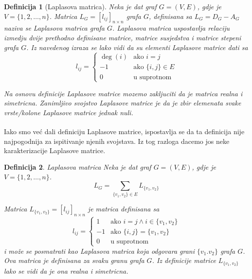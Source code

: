 \documentclass[11pt]{article}
\newtheorem{definition}{Definicija}
\begin{document}
			\begin{definition}[Laplasova matrica] 
			Neka je dat graf $G = (V, E)$, gdje je $V = \{1, 2, \dots, n\}$. Matrica $L_G = [l_{ij}]_{n \times n}$ grafa $G$, definisana sa $L_G = D_G - A_G$ naziva se Laplasova matrica grafa $G$.
			Laplasova matrica uspostavlja relaciju izmedju dvije prethodno definisane matrice, matrice susjedstva i matrice stepeni grafa $G$.
			Iz navedenog izraza se lako vidi da su elementi Laplasove matrice dati sa
			 \[
				 l_{ij} =
				 \begin{cases}
				 \deg(i)  & \text{ako } i = j \\
				 -1 & \text{ako } \{i, j\} \in E \\ 
				 0  & \text{u suprotnom}
				 \end{cases}
			 \]
			
			Na osnovu definicije Laplasove matrice mozemo zakljuciti da je matrica realna i simetricna.
			Zanimljivo svojstvo Laplasove matrice je da je zbir elemenata svake vrste/kolone Laplasove matrice jednak nuli.
			\end{definition}
	
			\paragraph{}
			Iako smo već dali definiciju Laplasove matrice, ispostavlja se da ta definicija nije najpogodnija za ispitivanje njenih svojstava. Iz tog razloga dacemo jos neke karakterizacije Laplasove matrice.
	
			\begin{definition}{Laplasova matrica}
			Neka je dat graf $G = (V, E)$, gdje je $V = \{1, 2, \dots, n\}$. 
			\[
				L_G = \sum_{\{v_1,v_2\} \in E} L_{\{v_1,v_2\}}
			\] 
			
			Matrica $L_{\{v_1,v_2\}} = [l_{ij}]_{n \times n}$ je matrica definisana sa
			\[
				 l_{ij} =
				 \begin{cases}
				 1  & \text{ako } i = j  \land i \in \{v_1,v_2\} \\
				 -1 & \text{ako } \{i,j\} = \{v_1,v_2\} \\ 
				 0  & \text{u suprotnom}
				 \end{cases}
			 \]
			i može se posmatrati kao Laplasova matrica koja odgovara grani $\{v_1.v_2\}$ grafa $G$. Ova matrica je definisana za svaku granu grafa $G$. Iz definicije matrice $L_{\{v_1,v_2\}}$ lako se vidi da je ona realna i 					simetricna.
			\end{definition}
			
\end{document}
